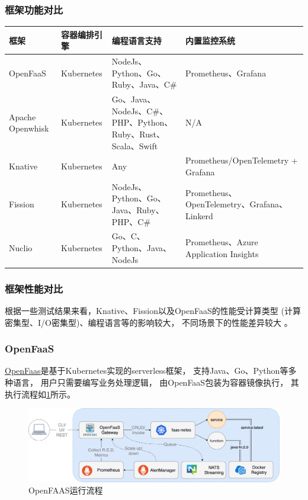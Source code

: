 \subsubsection{框架功能对比}
\begin{table}[ht]
\begin{tabularx}{\textwidth}{|p{2cm}|X|X|X|}
\toprule
\textbf{框架} & \textbf{容器编排引擎} & \textbf{编程语言支持} & \textbf{内置监控系统}\\
\midrule
OpenFaaS & Kubernetes & NodeJs、Python、Go、Ruby、Java、C\# & Prometheus、Grafana \\
\hline
Apache Openwhisk & Kubernetes & Go、Java、NodeJs、C\#、PHP、Python、Ruby、Rust、Scala、Swift & N/A \\
\hline
Knative & Kubernetes & Any & Prometheus/OpenTelemetry  + Grafana \\
\hline
Fission & Kubernetes & NodeJs、Python、Go、Java、Ruby、PHP、C\# & Prometheus、OpenTelemetry、Grafana、Linkerd  \\
\hline
Nuclio & Kubernetes & Go、C、Python、Java、NodeJs & Prometheus、Azure Application Insights\\
\bottomrule
\end{tabularx}
\end{table}

\subsubsection{框架性能对比}

根据一些测试结果来看，Knative、Fission以及OpenFaaS的性能受计算类型
(计算密集型、I/O密集型)、编程语言等的影响较大，
不同场景下的性能差异较大
\cite{faas_performance_aspects,understanding_faas}。

\subsubsection{OpenFaaS}
\href{https://www.openfaas.com/}{OpenFaas}是基于Kubernetes实现的serverless框架，
支持Java、Go、Python等多种语言，
用户只需要编写业务处理逻辑，
由OpenFaaS包装为容器镜像执行，
其执行流程如\cref{openfaas_workflow}所示\cite{openfaas_arch}。

\begin{figure}[ht!]
    \centering
    \includegraphics[width=\linewidth]{images/openfaas-workflow.png}
    \caption{OpenFAAS运行流程}
    \label{openfaas_workflow}
\end{figure}

